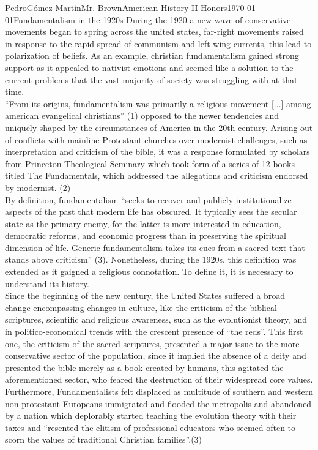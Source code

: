 \documentclass[12pt, letterpaper]{article}
\begin{document}
\begin{mla}{Pedro}{G\'{o}mez Mart\'{i}n}{Mr. Brown}{American History II Honors}{\today}{Fundamentalism in the 1920s}
  During the 1920 a new wave of conservative movements began to spring across the united states, far-right movements raised in response to the rapid spread of communism and left wing currents, this lead to polarization of beliefs. As an example, christian fundamentalism gained strong support as it appealed to nativist emotions and seemed like a solution to the current problems that the vast majority of society was struggling with at that time.\\
  “From its origins, fundamentalism was primarily a religious movement [...] among american evangelical christians” (1) opposed to the newer tendencies and uniquely shaped by the circumstances of America in the 20th century. Arising out of conflicts with mainline Protestant churches over modernist challenges, such as interpretation and criticism of the bible, it was a response formulated by scholars from Princeton Theological Seminary which took form of a series of 12 books titled The Fundamentals, which addressed the allegations and criticism endorsed by modernist. (2)\\ 
  By definition, fundamentalism “seeks to recover and publicly institutionalize aspects of the past that modern life has obscured. It typically sees the secular state as the primary enemy, for the latter is more interested in education, democratic reforms, and economic progress than in preserving the spiritual dimension of life. Generic fundamentalism takes its cues from a sacred text that stands above criticism” (3). Nonetheless, during the 1920s, this definition was extended as it gaigned a religious connotation. To define it, it is necessary to understand its history.\\
  Since the beginning of the new century, the United States suffered a broad change encompassing changes in culture, like the criticism of the biblical scriptures, scientific and religious awareness, such as the evolutionist theory, and in politico-economical trends with the crescent presence of “the reds”. This first one, the criticism of the sacred scriptures, presented a major issue to the more conservative sector of the population, since it implied the absence of a deity and presented the bible merely as a book created by humans, this agitated the aforementioned sector, who feared the destruction of their widespread core values.\\
  Furthermore, Fundamentalists felt displaced as multitude of southern and western non-protestant Europeans immigrated and flooded the metropolis and abandoned by a nation which deplorably started teaching the evolution theory with their taxes and “resented the elitism of professional educators who seemed often to scorn the values of traditional Christian families”.(3)\\

\end{mla}
\end{document}
